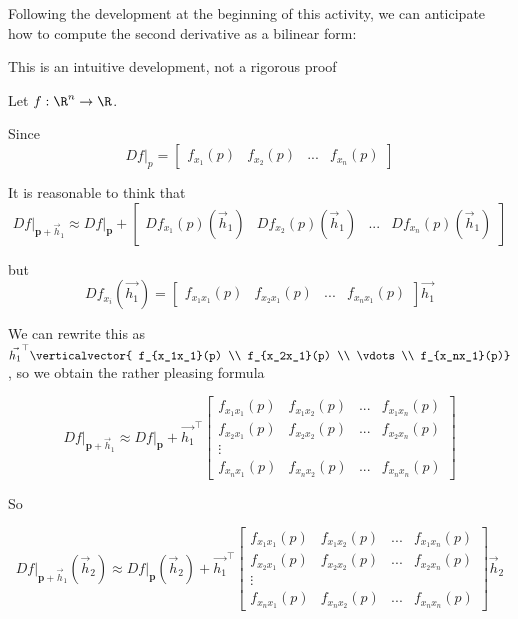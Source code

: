 \documentclass{ximera}
\begin{document}
Following the development at the beginning of this activity, we can anticipate how to compute the second derivative as a bilinear form:

\begin{warning}
	This is an intuitive development, not a rigorous proof
\end{warning}

Let $f:\R^n \to \R$.

Since \[Df\big|_p =  \begin{bmatrix}  f_{x_1}(p) & f_{x_2}(p) & ...& f_{x_n}(p) \end{bmatrix}\] 

It is reasonable to think that
 \[ Df\big|_{\mathbf{p}+\vec{h}_1} \approx Df\big|_{\mathbf{p}}+\begin{bmatrix} Df_{x_1}(p)(\vec{h}_1) & Df_{x_2}(p)(\vec{h}_1) & ...& Df_{x_n}(p)(\vec{h}_1) \end{bmatrix}\]
 
 but \[Df_{x_i}(\vec{h_1})  = \begin{bmatrix} f_{x_1x_1}(p)  & f_{x_2x_1}(p) & ... & f_{x_nx_1}(p)\end{bmatrix} \vec{h_1}\]
 
 We can rewrite this as $\vec{h_1}^\top \verticalvector{ f_{x_1x_1}(p) \\ f_{x_2x_1}(p) \\ \vdots \\ f_{x_nx_1}(p)}$, so we obtain the rather pleasing formula
 
 
 \[ 
 Df\big|_{\mathbf{p}+\vec{h}_1} \approx Df\big|_{\mathbf{p}}+\vec{h_1}^\top
 \begin{bmatrix}
		 f_{x_1x_1}(p) &  f_{x_1x_2}(p) & ... &  f_{x_1x_n}(p)\\ f_{x_2x_1}(p) &  f_{x_2x_2}(p) & ... &  f_{x_2x_n}(p)\\ \vdots \\ f_{x_nx_1}(p) &  f_{x_nx_2}(p) & ... &  f_{x_nx_n}(p)
 \end{bmatrix} 
 \]
 
 
 So 
 
  \[ 
 Df\big|_{\mathbf{p}+\vec{h}_1}(\vec{h}_2) \approx Df\big|_{\mathbf{p}}(\vec{h}_2)+\vec{h_1}^\top
 \begin{bmatrix}
		 f_{x_1x_1}(p) &  f_{x_1x_2}(p) & ... &  f_{x_1x_n}(p)\\ f_{x_2x_1}(p) &  f_{x_2x_2}(p) & ... &  f_{x_2x_n}(p)\\ \vdots \\ f_{x_nx_1}(p) &  f_{x_nx_2}(p) & ... &  f_{x_nx_n}(p)
 \end{bmatrix} \vec{h}_2
 \]
 
\end{document}
